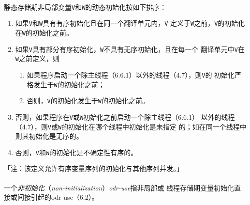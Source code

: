 \paragraph{}
静态存储期非局部变量\texttt{V}和\texttt{W}的动态初始化按如下排序：
\begin{enumerate}
  \item{如果\texttt{V}和\texttt{W}具有有序初始化且在同一个翻译单元内，\texttt{V}
    定义于\texttt{W}之前，\texttt{V}的初始化在\texttt{W}的初始化之前。}
  \item{如果\texttt{V}具有部分有序初始化，\texttt{W}不具有无序初始化，且在每一个
    翻译单元中\texttt{V}在\texttt{W}之前定义，则
    \begin{enumerate}
      \item{如果程序启动一个除主线程（6.6.1）以外的线程（4.7），则\texttt{V}的
        初始化严格发生于\texttt{W}的初始化之前；}
      \item{否则，\texttt{V}的初始化发生于\texttt{W}的初始化之前。}
  \end{enumerate}}
  \item{否则，如果程序在\texttt{V}或\texttt{W}初始化之前启动一个除主线程（6.6.1）
    以外的线程（4.7），则\texttt{V}或\texttt{W}的初始化在哪个线程中初始化是未指定
    的；如在同一个线程中则其初始化是无序的。}
  \item{否则，\texttt{V}和\texttt{W}的初始化是不确定性有序的。}
\end{enumerate}
「注：该定义允许有序变量序列的初始化与其他序列并发。」

\paragraph{}
一个\textit{非初始化}（\textit{non-initialization}）\textit{odr-use}指非局部或
线程存储期变量初始化直接或间接引起的odr-use（6.2）。

